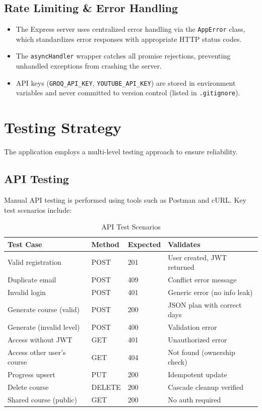 \documentclass[12pt,a4paper]{report}
\begin{document}
\subsection{Rate Limiting \& Error Handling}
\begin{itemize}[noitemsep]
    \item The Express server uses centralized error handling via the \texttt{AppError} class, which standardizes error responses with appropriate HTTP status codes.
    \item The \texttt{asyncHandler} wrapper catches all promise rejections, preventing unhandled exceptions from crashing the server.
    \item API keys (\texttt{GROQ\_API\_KEY}, \texttt{YOUTUBE\_API\_KEY}) are stored in environment variables and never committed to version control (listed in \texttt{.gitignore}).
\end{itemize}

\section{Testing Strategy}
The application employs a multi-level testing approach to ensure reliability.

\subsection{API Testing}
Manual API testing is performed using tools such as Postman and cURL. Key test scenarios include:

\begin{table}[H]
\centering
\caption{API Test Scenarios}
\label{tab:api-tests}
\begin{tabularx}{\textwidth}{l l l X}
\toprule
\textbf{Test Case} & \textbf{Method} & \textbf{Expected} & \textbf{Validates} \\
\midrule
Valid registration          & POST & 201 & User created, JWT returned \\
Duplicate email             & POST & 409 & Conflict error message \\
Invalid login               & POST & 401 & Generic error (no info leak) \\
Generate course (valid)     & POST & 200 & JSON plan with correct days \\
Generate (invalid level)    & POST & 400 & Validation error \\
Access without JWT          & GET  & 401 & Unauthorized error \\
Access other user's course  & GET  & 404 & Not found (ownership check) \\
Progress upsert             & PUT  & 200 & Idempotent update \\
Delete course               & DELETE & 200 & Cascade cleanup verified \\
Shared course (public)      & GET  & 200 & No auth required \\
\bottomrule
\end{tabularx}
\end{table}
\end{document}
